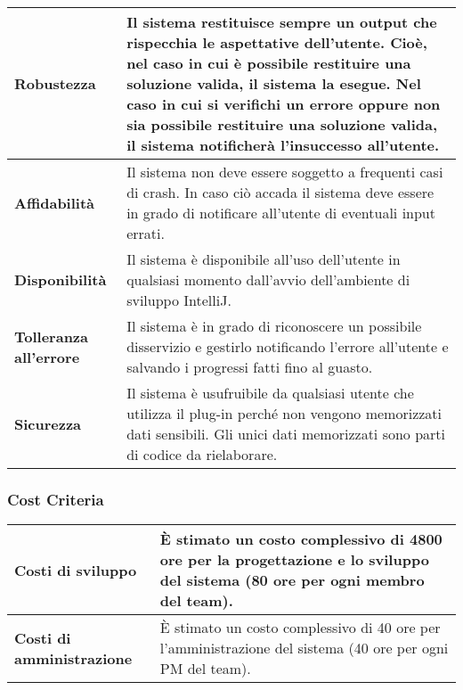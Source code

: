 		\begin{tabular}{|p{3cm}|p{13cm}|}
			\hline
			
			\vfill \centering \textbf{Robustezza} \vfill & \vfill Il sistema restituisce sempre un output che rispecchia le aspettative dell'utente. Cioè, nel caso in cui è possibile restituire una soluzione valida, il sistema la esegue. Nel caso in cui si verifichi un errore oppure non sia possibile restituire una soluzione valida, il sistema notificherà l'insuccesso all'utente. \vfill \\ 
			\hline 			
			\vfill \centering \textbf{Affidabilità} \vfill & \vfill Il sistema non deve essere soggetto a frequenti casi di crash. In caso ciò accada il sistema deve essere in grado di notificare all'utente di eventuali input errati. \vfill \\
			\hline
			\vfill \centering \textbf{Disponibilità} \vfill & \vfill Il sistema è disponibile all'uso dell'utente in qualsiasi momento dall'avvio dell'ambiente di sviluppo IntelliJ. \vfill \\
			\hline
			\vfill \centering \textbf{Tolleranza all'errore} \vfill & \vfill Il sistema è in grado di riconoscere un possibile disservizio e gestirlo notificando l'errore all'utente e salvando i progressi fatti fino al guasto. \vfill \\ 
			\hline 			
			\vfill \centering \textbf{Sicurezza} \vfill & \vfill Il sistema è usufruibile da qualsiasi utente che utilizza il plug-in perché non vengono memorizzati dati sensibili. Gli unici dati memorizzati sono parti di codice da rielaborare. \vfill \\
			\hline
			
		\end{tabular}

\subsubsection{Cost Criteria}

		\begin{tabular}{|p{3cm}|p{13cm}|}
			\hline
			
			\vfill \centering \textbf{Costi di sviluppo} \vfill & \vfill È stimato un costo complessivo di 4800 ore per la progettazione e lo sviluppo del sistema (80 ore per ogni membro del team). \vfill \\
			\hline 			
			\vfill \centering \textbf{Costi di amministrazione} \vfill & \vfill È stimato un costo complessivo di 40 ore per l'amministrazione del sistema (40 ore per ogni PM del team). \vfill \\
			\hline
			
		\end{tabular}

